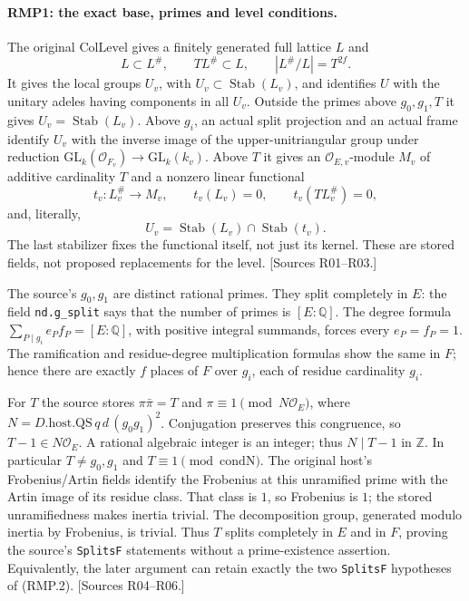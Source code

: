 \paragraph{RMP1: the exact base, primes and level conditions.}
\label{claim:RMP1}
The original $\mathrm{ColLevel}$ gives a finitely generated full lattice $L$ and
\[
 L\subset L^{\#},\qquad T L^{\#}\subset L,\qquad
 |L^{\#}/L|=T^{2f}.                                    \tag{RMP.4}
\]
It gives the local groups $U_v$, with $U_v\subset\operatorname{Stab}(L_v)$,
and identifies $U$ with the unitary adeles having components in all
$U_v$. Outside the primes above $g_0,g_1,T$ it gives
$U_v=\operatorname{Stab}(L_v)$. Above $g_i$, an actual split projection
and an actual frame identify $U_v$ with the inverse image of the
upper-unitriangular group under reduction
$\mathrm{GL}_k(\mathcal O_{F_v})\to\mathrm{GL}_k(k_v)$.
Above $T$ it gives an $\mathcal O_{E,v}$-module $M_v$ of additive
cardinality $T$ and a nonzero linear functional
\[
 t_v:L_v^{\#}\longrightarrow M_v,\qquad
 t_v(L_v)=0,\qquad t_v(TL_v^{\#})=0,
\]
and, literally,
\[
 U_v=\operatorname{Stab}(L_v)\cap\operatorname{Stab}(t_v).
                                                               \tag{RMP.5}
\]
The last stabilizer fixes the functional itself, not just its kernel.
These are stored fields, not proposed replacements for the level.
[Sources R01--R03.]

The source's $g_0,g_1$ are distinct rational primes. They split
completely in $E$: the field \texttt{nd.g\_split} says that the
number of primes is $[E:\mathbb Q]$. The degree formula
$\sum_{P\mid g_i}e_P f_P=[E:\mathbb Q]$, with positive integral
summands, forces every $e_P=f_P=1$. The ramification and residue-degree
multiplication formulas show the same in $F$; hence there are exactly
$f$ places of $F$ over $g_i$, each of residue cardinality $g_i$.

For $T$ the source stores $\pi\bar\pi=T$ and
$\pi\equiv1\pmod{N\mathcal O_E}$, where
$N=D.\mathrm{host}.\mathrm{QS}\,q\,d\,(g_0g_1)^2$.
Conjugation preserves this congruence, so $T-1\in N\mathcal O_E$.
A rational algebraic integer is an integer; thus $N\mid T-1$ in
$\mathbb Z$. In particular $T\ne g_0,g_1$ and
$T\equiv1\pmod{\mathrm{condN}}$.
The original host's Frobenius/Artin fields identify the Frobenius at
this unramified prime with the Artin image of its residue class.
That class is $1$, so Frobenius is $1$; the stored unramifiedness
makes inertia trivial. The decomposition group, generated modulo
inertia by Frobenius, is trivial. Thus $T$ splits completely in $E$
and in $F$, proving the source's \texttt{SplitsF} statements without
a prime-existence assertion. Equivalently, the later argument can
retain exactly the two \texttt{SplitsF} hypotheses of (RMP.2).
[Sources R04--R06.]

